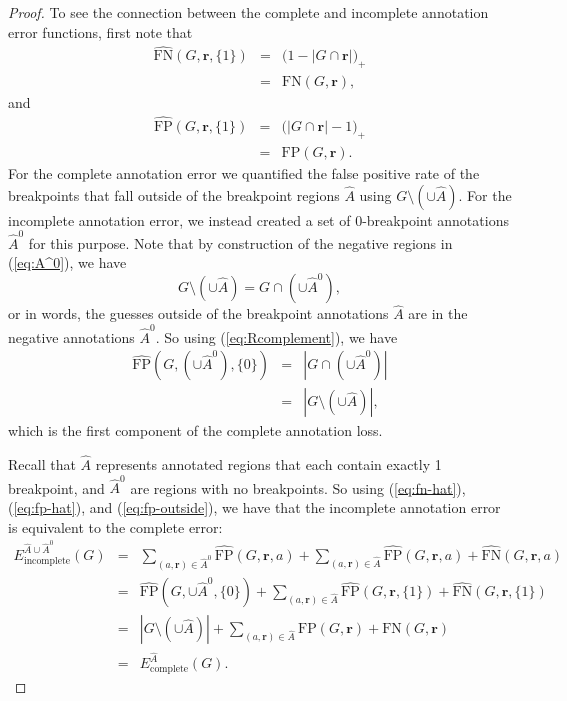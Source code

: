 \documentclass{jsfds} %
\renewcommand{\r}{ \mathbf{ r} }
\begin{document}
\begin{proof}

To see the connection between the complete and incomplete annotation
error functions, first note that
\begin{eqnarray}
\nonumber  \hat{\text{FN}}(G,\r,\{1\}) 
&=&   \big(
1-|G\cap\r|
\big)_+\\
&=&
\text{FN}(G,\r), \label{eq:fn-hat}
\end{eqnarray}
and
\begin{eqnarray}
\nonumber
  \hat{\text{FP}}(G,\r,\{1\}) 
&=&
\big( 
|G\cap\r|-1
\big)_+\\
&=& \text{FP}(G,\r). \label{eq:fp-hat}
\end{eqnarray}
For the complete annotation error we quantified the false positive
rate of the breakpoints that fall outside of the breakpoint regions
$\hat A$ using $G\setminus(\cup \hat A)$. For the incomplete
annotation error, we instead created a set of 0-breakpoint annotations
$\hat A^0$ for this purpose. Note that by construction of the negative
regions in (\ref{eq:A^0}), we have 
\begin{equation}
  \label{eq:Rcomplement}
  G\setminus \left(\cup \hat A\right)
 = 
G\cap\left(\cup \hat A^0 \right),
\end{equation}
or in words, the guesses outside of the breakpoint annotations $\hat A$
are in the negative annotations $\hat A^0$. So using
(\ref{eq:Rcomplement}), we have
\begin{eqnarray}
  \hat{\text{FP}}(G,(\cup \hat A^0),\{0\})
&=& 
|G\cap(
  \cup \hat A^0
)|\nonumber
\\
&=&
|G\setminus(\cup\hat A)|,\label{eq:fp-outside}
\end{eqnarray}
which is the first component of the complete annotation loss.

Recall that $\hat A$ represents annotated regions that each contain
exactly 1 breakpoint, and $\hat A^0$ are regions with no breakpoints. So
using (\ref{eq:fn-hat}), (\ref{eq:fp-hat}), and
(\ref{eq:fp-outside}), we have that the incomplete annotation error
is equivalent to the complete error:
\begin{eqnarray}
  E_{\text{incomplete}}^{\hat A\cup \hat A^0}(G)
&=&
\sum_{(a, \r)\in \hat A^0} \hat{\text{FP}}(G,\r,a)\nonumber 
+
\sum_{(a, \r)\in\hat A} \hat{\text{FP}}(G,\r,a) + \hat{\text{FN}}(G,\r,a)
 \\
&=&
 \hat{\text{FP}}(G,\cup \hat A^0,\{0\})\nonumber 
+
\sum_{(a, \r)\in\hat A} \hat{\text{FP}}(G,\r,\{1\}) + \hat{\text{FN}}(G,\r,\{1\})
 \\
&=&
|G\setminus(\cup\hat A)|
+\nonumber
\sum_{(a, \r)\in\hat A} {\text{FP}}(G,\r) + {\text{FN}}(G,\r)\\
&=&
E^{\hat A}_{\text{complete}}(G).
\end{eqnarray}

\end{proof}
\end{document}
